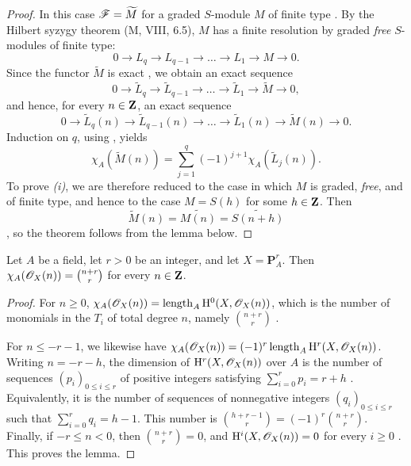 \begin{proof}
In this case $\mathscr{F}=\widetilde{M}$ for a graded $S$-module $M$ of finite type .
By the Hilbert syzygy theorem (M, VIII, 6.5), $M$ has a finite resolution by graded \emph{free} $S$-modules of finite type:
\[
  0\longrightarrow L_q
  \longrightarrow L_{q-1}
  \longrightarrow\ldots
  \longrightarrow L_1
  \longrightarrow M
  \longrightarrow0.
\]
Since the functor $\widetilde{M}$ is exact , we obtain an exact sequence
\[
  0\longrightarrow\widetilde{L}_q
  \longrightarrow\widetilde{L}_{q-1}
  \longrightarrow\ldots
  \longrightarrow\widetilde{L}_1
  \longrightarrow\widetilde{M}
  \longrightarrow0,
\]
and hence, for every $n\in\mathbf{Z}$, an exact sequence
\[
  0\longrightarrow\widetilde{L}_q(n)
  \longrightarrow\widetilde{L}_{q-1}(n)
  \longrightarrow\ldots
  \longrightarrow\widetilde{L}_1(n)
  \longrightarrow\widetilde{M}(n)
  \longrightarrow0.
\]
Induction on $q$, using , yields
\[
  \chi_A(\widetilde{M}(n))
  =
  \sum_{j=1}^{q}
  (-1)^{j+1}\chi_A(\widetilde{L}_j(n)).
\]
To prove \emph{(i)}, we are therefore reduced to the case in which $M$ is graded, \emph{free}, and of finite type, and hence to the case $M=S(h)$
for some $h\in\mathbf{Z}$.
Then
\[
  \widetilde{M}(n)
  =
  \widetilde{M(n)}
  =
  \widetilde{S(n+h)}
\]
, so the theorem follows from the lemma below.
\end{proof}

\begin{lemma}[2.5.3.1]
\label{III.2.5.3.1}
Let $A$ be a field, let $r>0$ be an integer, and let $X=\mathbf{P}_A^r$.
Then $\chi_A(\mathscr{O}_X(n))
=
\binom{n+r}{r}$
for every $n\in\mathbf{Z}$.
\end{lemma}

\begin{proof}
For $n\geq0$, $\chi_A(\mathscr{O}_X(n))
=
\operatorname{length}_A\mathrm{H}^0(X,\mathscr{O}_X(n))$,
which is the number of monomials in the $T_i$ of total degree $n$, namely $\binom{n+r}{r}$
.

For $n\leq-r-1$, we likewise have $\chi_A(\mathscr{O}_X(n))
=
(-1)^r\operatorname{length}_A\mathrm{H}^r(X,\mathscr{O}_X(n))$.
Writing $n=-r-h$, the dimension of $\mathrm{H}^r(X,\mathscr{O}_X(n))$ over $A$ is the number of sequences $(p_i)_{0\leq i\leq r}$
of positive integers satisfying $\sum_{i=0}^{r}p_i=r+h$
.
Equivalently, it is the number of sequences of nonnegative integers $(q_i)_{0\leq i\leq r}$
such that $\sum_{i=0}^{r}q_i=h-1$.
This number is $\binom{h+r-1}{r}=(-1)^r\binom{n+r}{r}$.
Finally, if $-r\leq n<0$, then $\binom{n+r}{r}=0$,
and $\mathrm{H}^i(X,\mathscr{O}_X(n))=0$ for every $i\geq0$ .
This proves the lemma.
\end{proof}


